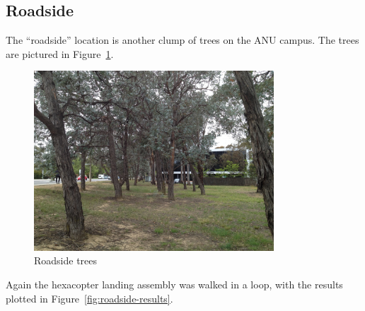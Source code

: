 \documentclass[12pt,oneside,a4paper]{book}
\begin{document}
\subsection{Roadside}
\label{sec:roadside}

The ``roadside'' location is another clump of trees on the ANU
campus. The trees are pictured in Figure~\ref{fig:roadside-trees}.

\begin{figure}
  \centering
  \includegraphics[width=0.8\textwidth]{figs/roadside-1}
  \caption{Roadside trees}
  \label{fig:roadside-trees}
\end{figure}

Again the hexacopter landing assembly was walked in a loop, with the
results plotted in Figure~\ref{fig:roadside-results}.
\end{document}
